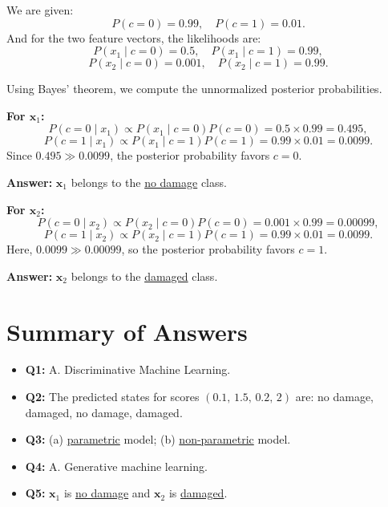 \documentclass[12pt]{article}
\begin{document}
We are given:
\[
P(c=0)=0.99,\quad P(c=1)=0.01.
\]
And for the two feature vectors, the likelihoods are:
\[
P(x_1\mid c=0)=0.5,\quad P(x_1\mid c=1)=0.99,
\]
\[
P(x_2\mid c=0)=0.001,\quad P(x_2\mid c=1)=0.99.
\]

Using Bayes' theorem, we compute the unnormalized posterior probabilities.

\textbf{For \(\bm{x}_1\):}
\[
P(c=0 \mid x_1) \propto P(x_1 \mid c=0)P(c=0)=0.5 \times 0.99=0.495,
\]
\[
P(c=1 \mid x_1) \propto P(x_1 \mid c=1)P(c=1)=0.99 \times 0.01=0.0099.
\]
Since \(0.495 \gg 0.0099\), the posterior probability favors \(c=0\).

\textbf{Answer:} \(\bm{x}_1\) belongs to the \underline{no damage} class.

\bigskip

\textbf{For \(\bm{x}_2\):}
\[
P(c=0 \mid x_2) \propto P(x_2 \mid c=0)P(c=0)=0.001 \times 0.99=0.00099,
\]
\[
P(c=1 \mid x_2) \propto P(x_2 \mid c=1)P(c=1)=0.99 \times 0.01=0.0099.
\]
Here, \(0.0099 \gg 0.00099\), so the posterior probability favors \(c=1\).

\textbf{Answer:} \(\bm{x}_2\) belongs to the \underline{damaged} class.

\bigskip

\section*{Summary of Answers}

\begin{itemize}
    \item \textbf{Q1:} A. Discriminative Machine Learning.
    \item \textbf{Q2:} The predicted states for scores \((0.1,\,1.5,\,0.2,\,2)\) are: no damage, damaged, no damage, damaged.
    \item \textbf{Q3:} (a) \underline{parametric} model; (b) \underline{non-parametric} model.
    \item \textbf{Q4:} A. Generative machine learning.
    \item \textbf{Q5:} \(\bm{x}_1\) is \underline{no damage} and \(\bm{x}_2\) is \underline{damaged}.
\end{itemize}
\end{document}
